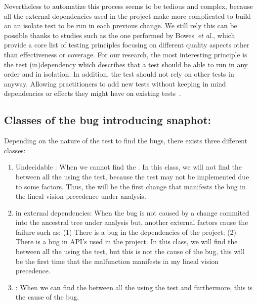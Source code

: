 \documentclass[a4paper, 12pt]{book}
\begin{document}
Nevertheless to automatize this process seems to be tedious and complex, because all the external dependencies used in the project make more complicated to build an an isolate test to be run in each previous change. We still rely this can be possible thanks to studies such as the one performed by Bowes~\emph{et al.}, which provide a core list of testing principles focusing on different quality aspects other than effectiveness or coverage. For our research, the most interesting principle is the test (in)dependency which describes that a test should be able to run in any order and in isolation. In addition, the test should  not  rely  on other tests in anyway. Allowing practitioners to add new tests without keeping in mind dependencies or effects they might have on existing tests~\cite{bowes2017good}.


\subsection{Classes of the bug introducing snaphot:}
Depending on the nature of the test to find the bugs, there exists three different \FFC classes:

\begin{enumerate}
	\item Undecidable \FFC : When we cannot find the \FFC. In this class, we will not find the \FFC between all the  using the test, because the test may not be implemented due to some factors. Thus, the \FFC will be the first change that manifests the bug in the lineal vision precedence under analysis.
	\item \FFC in external dependencies: When the bug is not caused by a change commited into the ancestral tree under analysis but, another external factors cause the failure such as: (1) There is a bug in the dependencies of the project; (2) There is a bug in API's used in the project. In this class, we will find the \FFC between all the  using the test, but this \FFC is not the cause of the bug, this \FFC will be the first time that the malfunction manifests in my lineal vision precedence.
	\item \FFC : When we can find the \FFC between all the  using the test and furthermore, this \FFC is the cause of the bug.
\end{enumerate}
\end{document}
